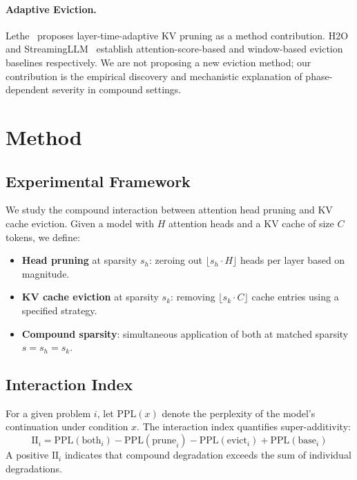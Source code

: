 \documentclass[11pt,a4paper]{article}
\begin{document}
\paragraph{Adaptive Eviction.}
Lethe~\cite{lethe2026} proposes layer-time-adaptive KV pruning as a method contribution. H2O~\cite{h2o2023} and StreamingLLM~\cite{streamingllm2023} establish attention-score-based and window-based eviction baselines respectively. We are not proposing a new eviction method; our contribution is the empirical discovery and mechanistic explanation of phase-dependent severity in compound settings.

\section{Method}

\subsection{Experimental Framework}

We study the compound interaction between attention head pruning and KV cache eviction. Given a model with $H$ attention heads and a KV cache of size $C$ tokens, we define:
\begin{itemize}[nosep]
\item \textbf{Head pruning} at sparsity $s_h$: zeroing out $\lfloor s_h \cdot H \rfloor$ heads per layer based on magnitude.
\item \textbf{KV cache eviction} at sparsity $s_k$: removing $\lfloor s_k \cdot C \rfloor$ cache entries using a specified strategy.
\item \textbf{Compound sparsity}: simultaneous application of both at matched sparsity $s = s_h = s_k$.
\end{itemize}

\subsection{Interaction Index}

For a given problem $i$, let $\text{PPL}(x)$ denote the perplexity of the model's continuation under condition $x$. The interaction index quantifies super-additivity:
\begin{equation}
\text{II}_i = \text{PPL}(\text{both}_i) - \text{PPL}(\text{prune}_i) - \text{PPL}(\text{evict}_i) + \text{PPL}(\text{base}_i)
\end{equation}
A positive $\text{II}_i$ indicates that compound degradation exceeds the sum of individual degradations.
\end{document}

